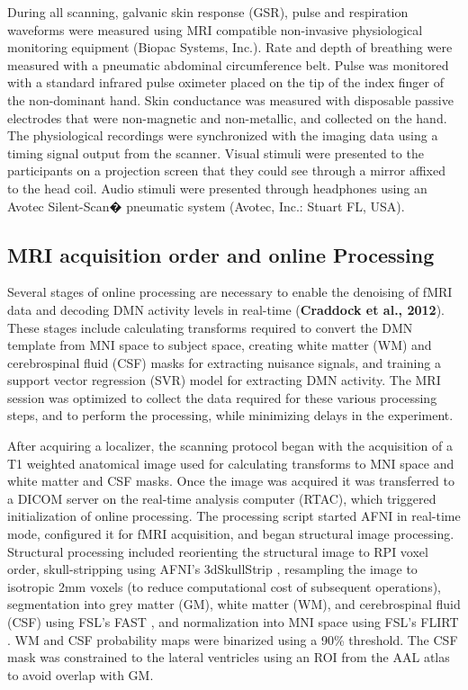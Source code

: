 During all scanning, galvanic skin response (GSR), pulse and respiration waveforms were measured using MRI compatible non-invasive physiological monitoring equipment (Biopac Systems, Inc.). Rate and depth of breathing were measured with a pneumatic abdominal circumference belt. Pulse was monitored with a standard infrared pulse oximeter placed on the tip of the index finger of the non-dominant hand. Skin conductance was measured with disposable passive electrodes that were non-magnetic and non-metallic, and collected on the hand. The physiological recordings were synchronized with the imaging data using a timing signal output from the scanner. Visual stimuli were presented to the participants on a projection screen that they could see through a mirror affixed to the head coil. Audio stimuli were presented through headphones using an Avotec Silent-Scan� pneumatic system (Avotec, Inc.: Stuart FL, USA).

\subsection{MRI acquisition order and online Processing}

Several stages of online processing are necessary to enable the denoising of fMRI data and decoding DMN activity levels in real-time (\textbf{Craddock et al., 2012}). These stages include calculating transforms required to convert the DMN template from MNI space to subject space, creating white matter (WM) and cerebrospinal fluid (CSF) masks for extracting nuisance signals, and training a support vector regression (SVR) model for extracting DMN activity. The MRI session was optimized to collect the data required for these various processing steps, and to perform the processing, while minimizing delays in the experiment.

After acquiring a localizer, the scanning protocol began with the acquisition of a T1 weighted anatomical image used for calculating transforms to MNI space and white matter and CSF masks. Once the image was acquired it was transferred to a DICOM server on the real-time analysis computer (RTAC), which triggered initialization of online processing. The processing script started AFNI in real-time mode, configured it for fMRI acquisition, and began structural image processing. Structural processing included reorienting the structural image to RPI voxel order, skull-stripping using AFNI's 3dSkullStrip \cite{Cox_1996}, resampling the image to isotropic 2mm voxels (to reduce computational cost of subsequent operations), segmentation into grey matter (GM), white matter (WM), and cerebrospinal fluid (CSF) using FSL's FAST \cite{Zhang2001}, and normalization into MNI space using FSL's FLIRT \cite{Jenkinson_2001,Jenkinson_2002}. WM and CSF probability maps were binarized using a 90\% threshold. The CSF mask was constrained to the lateral ventricles using an ROI from the AAL atlas to avoid overlap with GM.

